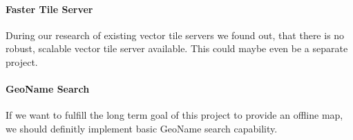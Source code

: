 \paragraph{Faster Tile Server}
During our research of existing vector tile servers we found out, that there is no robust, scalable vector tile server available. This could maybe even be a separate project.

\paragraph{GeoName Search}
If we want to fulfill the long term goal of this project to provide an offline map, we should definitly implement basic GeoName search capability.

\newpage{}